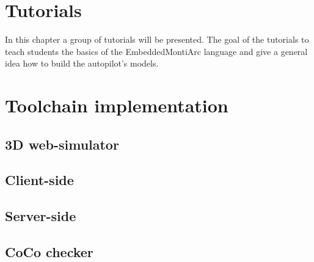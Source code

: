 \chapter{Tutorials}
In this chapter a group of tutorials will be presented. The goal of the tutorials to teach students the basics of the EmbeddedMontiArc language and give a general idea how to build the autopilot's models.
\chapter{Toolchain implementation}
\section{3D web-simulator}
\section{Client-side}
\section{Server-side}
\section{CoCo checker}
